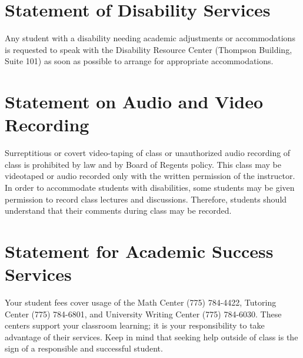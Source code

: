 \documentclass{article}
\begin{document}
\section*{Statement of Disability Services}
Any student with a disability needing academic adjustments or
accommodations is requested to speak with the Disability Resource
Center (Thompson Building, Suite 101) as soon as possible to arrange
for appropriate accommodations.

\section*{Statement on Audio and Video Recording}
Surreptitious or covert video-taping of class or unauthorized audio
recording of class is prohibited by law and by Board of Regents
policy. This class may be videotaped or audio recorded only with the
written permission of the instructor. In order to accommodate students
with disabilities, some students may be given permission to record
class lectures and discussions. Therefore, students should understand
that their comments during class may be recorded.

\section*{Statement for Academic Success Services}
Your student fees cover usage of the Math Center (775) 784-4422,
Tutoring Center (775) 784-6801, and University Writing Center (775)
784-6030. These centers support your classroom learning; it is your
responsibility to take advantage of their services. Keep in mind that
seeking help outside of class is the sign of a responsible and
successful student.
\end{document}
